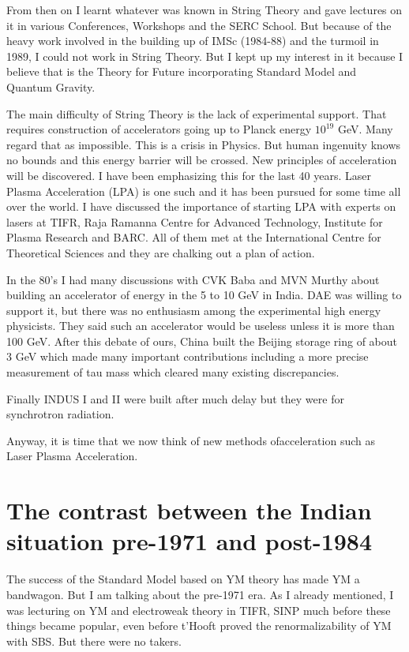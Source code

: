 From then on I learnt whatever was known in String Theory and gave 
lectures on it in various Conferences, Workshops and the SERC School. 
But because of the heavy work involved in the building up of IMSc 
(1984-88) and the turmoil in 1989, I could not work in String Theory. 
But I kept up my interest in it because I believe that is the Theory for 
Future incorporating Standard Model and Quantum Gravity.

The main difficulty of String Theory is the lack of experimental 
support. That requires construction of accelerators going up to Planck 
energy $10^{19}$ GeV. Many regard that as impossible. This is a crisis in 
Physics. But human ingenuity knows no bounds and this energy barrier 
will be crossed. New principles of acceleration will be discovered. I 
have been emphasizing this for the last 40 years. Laser Plasma 
Acceleration (LPA) is one such and it has been pursued for some time all 
over the world. I have discussed the importance of starting LPA with 
experts on lasers at TIFR, Raja Ramanna Centre for Advanced Technology, 
Institute for Plasma Research and BARC. All of them met at the 
International Centre for Theoretical Sciences and they are chalking out 
a plan of action.

In the 80's I had many discussions with CVK Baba and MVN Murthy about 
building an accelerator of energy in the 5 to 10 GeV in India. DAE was 
willing to support it, but there was no enthusiasm among the 
experimental high energy physicists. They said such an accelerator would 
be useless unless it is more than 100 GeV. After this debate of ours, 
China built the Beijing storage ring of about 3 GeV which made many 
important contributions including a more precise measurement of tau mass 
which cleared many existing discrepancies.

Finally INDUS I and II were built after much delay but they were for 
synchrotron radiation.

Anyway, it is time that we now think of new methods of\break acceleration such 
as Laser Plasma Acceleration.

\vspace{-\topsep}
\section*{The contrast between the Indian situation pre-1971 and post-1984}

The success of the Standard Model based on YM theory has made YM a 
bandwagon. But I am talking about the pre-1971 era. As I already 
mentioned, I was lecturing on YM and electroweak theory in TIFR, SINP 
much before these things became popular, even before t'Hooft proved the 
renormalizability of YM with SBS. But there were no takers.


